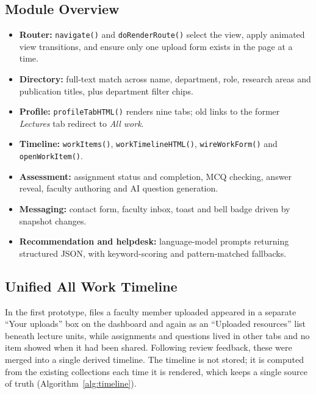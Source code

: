 \documentclass[conference]{IEEEtran}
\begin{document}
\subsection{Module Overview}
\begin{itemize}
  \item \textbf{Router:} \texttt{navigate()} and \texttt{doRenderRoute()} select the view, apply animated view transitions, and ensure only one upload form exists in the page at a time.
  \item \textbf{Directory:} full-text match across name, department, role, research areas and publication titles, plus department filter chips.
  \item \textbf{Profile:} \texttt{profileTabHTML()} renders nine tabs; old links to the former \emph{Lectures} tab redirect to \emph{All work}.
  \item \textbf{Timeline:} \texttt{workItems()}, \texttt{workTimelineHTML()}, \texttt{wireWorkForm()} and \texttt{openWorkItem()}.
  \item \textbf{Assessment:} assignment status and completion, MCQ checking, answer reveal, faculty authoring and AI question generation.
  \item \textbf{Messaging:} contact form, faculty inbox, toast and bell badge driven by snapshot changes.
  \item \textbf{Recommendation and helpdesk:} language-model prompts returning structured JSON, with keyword-scoring and pattern-matched fallbacks.
\end{itemize}

\subsection{Unified All Work Timeline}
In the first prototype, files a faculty member uploaded appeared in a separate ``Your uploads'' box on the dashboard and again as an ``Uploaded resources'' list beneath lecture units, while assignments and questions lived in other tabs and no item showed when it had been shared. Following review feedback, these were merged into a single derived timeline. The timeline is not stored; it is computed from the existing collections each time it is rendered, which keeps a single source of truth (Algorithm~\ref{alg:timeline}).
\end{document}

